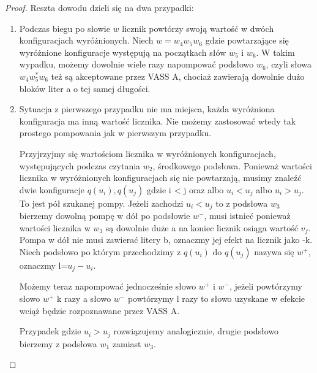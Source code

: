 \documentclass[magisterska]{pracamgr}
\newtheorem{proof}[theorem]{Dowód}
\begin{document}
\begin{example}
\begin{proof}
            Reszta dowodu dzieli się na dwa przypadki:
            \begin{enumerate}
                \item Podczas biegu po słowie $w$ licznik powtórzy swoją wartość w dwóch konfiguracjach wyróżnionych.
                Niech $w=w_4 w_5 w_6$ gdzie powtarzające się wyróżnione konfiguracje występują na początkach słów $w_5$ i $w_6$.
                W takim wypadku, możemy dowolnie wiele razy napompować podsłowo $w_6$, czyli słowa $w_4 w_5^* w_6$ też są akceptowane
                przez VASS A, chociaż zawierają dowolnie dużo bloków liter a o tej samej długości.
                \item Sytuacja z pierwszego przypadku nie ma miejsca, każda wyróżniona konfiguracja ma inną wartość licznika.
                Nie możemy zastosować wtedy tak prostego pompowania jak w pierwszym przypadku.


                Przyjrzyjmy się wartościom licznika w wyróżnionych konfiguracjach, występujących podczas czytania $w_2$, środkowego podsłowa.
                Ponieważ wartości licznika w wyróżnionych konfiguracjach się nie powtarzają, musimy znaleźć dwie konfiguracje
                $q(u_i),q(u_j)$ gdzie i < j oraz albo $u_i < u_j$ albo $u_i > u_j$.
                To jest pół szukanej pompy.
                Jeżeli zachodzi $u_i < u_j$ to z podsłowa $w_3$ bierzemy dowolną pompę w dół po podsłowie $w^-$, musi istnieć ponieważ wartości
                licznika w $w_3$ są dowolnie duże a na koniec licznik osiąga wartość $v_f$.
                Pompa w dół nie musi zawierać litery b, oznaczmy jej efekt na licznik jako -k.
                Niech podsłowo po którym przechodzimy z $q(u_i) \text{ do } q(u_j)$ nazywa się $w^+$, oznaczmy l=$u_j-u_i$.

                Możemy teraz napompować jednocześnie słowo $w^+$ i $w^-$, jeżeli powtórzymy słowo $w^+$ k razy a słowo $w^-$
                powtórzymy l razy to słowo uzyskane w efekcie wciąż będzie rozpoznawane przez VASS A.

                Przypadek gdzie $u_i > u_j$ rozwiązujemy analogicznie, drugie podsłowo bierzemy z podsłowa $w_1$ zamiast $w_3$.
            \end{enumerate}
        \end{proof}


    \end{example}

\end{document}
